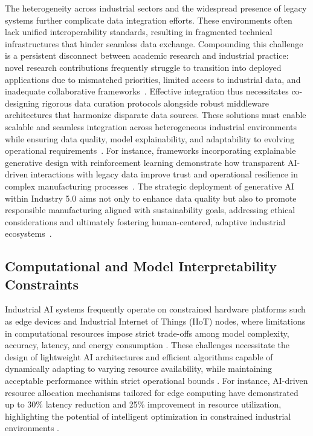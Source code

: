 \documentclass[sigconf]{acmart}
\begin{document}
The heterogeneity across industrial sectors and the widespread presence of legacy systems further complicate data integration efforts. These environments often lack unified interoperability standards, resulting in fragmented technical infrastructures that hinder seamless data exchange. Compounding this challenge is a persistent disconnect between academic research and industrial practice: novel research contributions frequently struggle to transition into deployed applications due to mismatched priorities, limited access to industrial data, and inadequate collaborative frameworks~\cite{ref3}. Effective integration thus necessitates co-designing rigorous data curation protocols alongside robust middleware architectures that harmonize disparate data sources. These solutions must enable scalable and seamless integration across heterogeneous industrial environments while ensuring data quality, model explainability, and adaptability to evolving operational requirements~\cite{ref6,ref9}. For instance, frameworks incorporating explainable generative design with reinforcement learning demonstrate how transparent AI-driven interactions with legacy data improve trust and operational resilience in complex manufacturing processes~\cite{ref9}. The strategic deployment of generative AI within Industry 5.0 aims not only to enhance data quality but also to promote responsible manufacturing aligned with sustainability goals, addressing ethical considerations and ultimately fostering human-centered, adaptive industrial ecosystems~\cite{ref6}.

\subsection{Computational and Model Interpretability Constraints}

Industrial AI systems frequently operate on constrained hardware platforms such as edge devices and Industrial Internet of Things (IIoT) nodes, where limitations in computational resources impose strict trade-offs among model complexity, accuracy, latency, and energy consumption \cite{ref2,ref31}. These challenges necessitate the design of lightweight AI architectures and efficient algorithms capable of dynamically adapting to varying resource availability, while maintaining acceptable performance within strict operational bounds \cite{ref31,ref34}. For instance, AI-driven resource allocation mechanisms tailored for edge computing have demonstrated up to 30\% latency reduction and 25\% improvement in resource utilization, highlighting the potential of intelligent optimization in constrained industrial environments \cite{ref31}.
\end{document}
